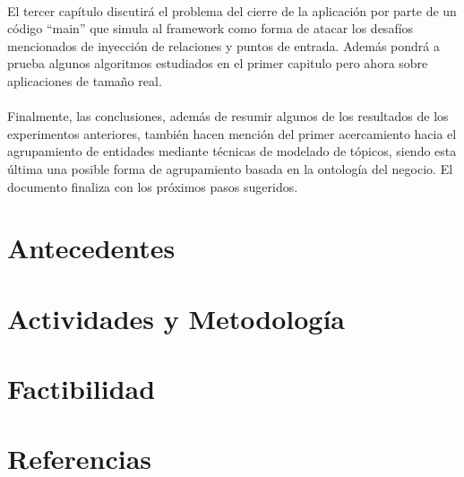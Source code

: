 \documentclass[a4paper,10pt]{article}
\begin{document}
\paragraph{}
El tercer cap\'itulo discutir\'a el problema del cierre de la aplicación por parte de un código “main” que simula al framework como forma de atacar los desafíos mencionados de inyección de relaciones y puntos de entrada. Adem\'as pondr\'a a prueba algunos algoritmos estudiados en el primer capitulo pero ahora sobre aplicaciones de tama\~no real.  
\paragraph{}
Finalmente, las conclusiones, además de resumir algunos de los resultados de los experimentos anteriores,  también hacen menci\'on del primer acercamiento hacia el agrupamiento de entidades mediante técnicas de modelado de tópicos, siendo esta \'ultima una posible forma de agrupamiento basada en la ontología del negocio.  El documento finaliza con los próximos pasos sugeridos.
\section*{Antecedentes}
\section*{Actividades y Metodolog\'ia}
\section*{Factibilidad}
\section*{Referencias}
\end{document}
